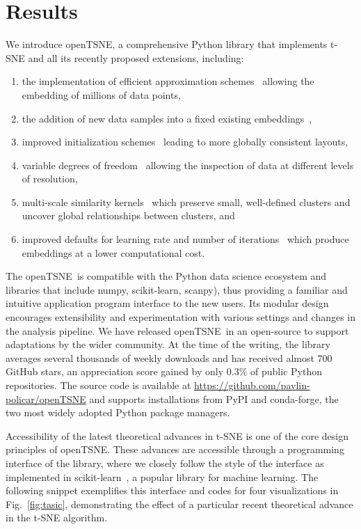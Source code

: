 \documentclass[twocolumn]{bmcart}
\newcommand{\opentsne}{\textsf{openTSNE}}
\begin{document}
\section*{Results}

We introduce \opentsne, a comprehensive Python library that implements t-SNE
and all its recently proposed extensions, including:
\begin{enumerate}
\item the implementation of efficient approximation 
	schemes~\cite{van2014accelerating,linderman2019fast} allowing the embedding
	of millions of data points,
\item the addition of new data samples into a fixed existing
	embeddings~\cite{policar2019embedding},
\item improved initialization schemes~\cite{kobak2019umap} leading to more
	globally consistent layouts,
\item variable degrees of freedom~\cite{kobak2019heavy} allowing the inspection
	of data at different levels of resolution,
\item multi-scale similarity kernels~\cite{kobak2019art} which preserve small,
	well-defined clusters and uncover global relationships between clusters,
	and
\item improved defaults for learning rate and number of
	iterations~\cite{belkina2019automated} which produce embeddings at a lower
	computational cost.
\end{enumerate}

The \opentsne\ is compatible with the Python data science ecosystem and
libraries that include \textsf{numpy}, \textsf{scikit-learn}, \textsf{scanpy}),
thus providing a familiar and intuitive application program interface to the new
users. Its modular design encourages extensibility and experimentation with
various settings and changes in the analysis pipeline.  We have released
\opentsne\ in an open-source to support adaptations by the wider community. At
the time of the writing, the library averages several thousands of weekly
downloads and has received almost 700 GitHub stars, an appreciation score gained
by only $0.3\%$ of public Python repositories. The source code is available at
\url{https://github.com/pavlin-policar/openTSNE} and supports installations from
\textsf{PyPI} and \textsf{conda-forge}, the two most widely adopted Python
package managers.

Accessibility of the latest theoretical advances in t-SNE is one of the core
design principles of \opentsne. These advances are accessible through a
programming interface of the library, where we closely follow the style of the
interface as implemented in \textsf{scikit-learn}~\cite{sklearn_api}, a popular
library for machine learning. The following snippet exemplifies this interface
and codes for four visualizations in Fig.~\ref{fig:tasic}, demonstrating the
effect of a particular recent theoretical advance in the t-SNE algorithm. 
\end{document}
